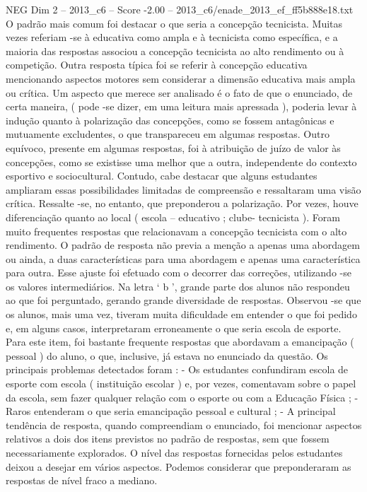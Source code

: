 \begin{textsample}{NEG Dim 2 – 2013\_c6 – Score -2.00 – 2013\_c6/enade\_2013\_ef\_ff5b888e18.txt}
O padrão mais comum foi destacar o que seria a concepção tecnicista.
Muitas vezes referiam -se à educativa como ampla e à tecnicista como específica, e a maioria das respostas associou a concepção tecnicista ao alto rendimento ou à competição.
Outra resposta típica foi se referir à concepção educativa mencionando aspectos motores sem considerar a dimensão educativa mais ampla ou crítica.
Um aspecto que merece ser analisado é o fato de que o enunciado, de certa maneira, ( pode -se dizer, em uma leitura mais apressada ), poderia levar à indução quanto à polarização das concepções, como se fossem antagônicas e mutuamente excludentes, o que transpareceu em algumas respostas.
Outro equívoco, presente em algumas respostas, foi à atribuição de juízo de valor às concepções, como se existisse uma melhor que a outra, independente do contexto esportivo e sociocultural.
Contudo, cabe destacar que alguns estudantes ampliaram essas possibilidades limitadas de compreensão e ressaltaram uma visão crítica.
Ressalte -se, no entanto, que preponderou a polarização.
Por vezes, houve diferenciação quanto ao local ( escola – educativo ; clube- tecnicista ).
Foram muito frequentes respostas que relacionavam a concepção tecnicista com o alto rendimento.
O padrão de resposta não previa a menção a apenas uma abordagem ou ainda, a duas características para uma abordagem e apenas uma característica para outra.
Esse ajuste foi efetuado com o decorrer das correções, utilizando -se os valores intermediários.
Na letra ‘ b ’, grande parte dos alunos não respondeu ao que foi perguntado, gerando grande diversidade de respostas.
Observou -se que os alunos, mais uma vez, tiveram muita dificuldade em entender o que foi pedido e, em alguns casos, interpretaram erroneamente o que seria escola de esporte.
Para este item, foi bastante frequente respostas que abordavam a emancipação ( pessoal ) do aluno, o que, inclusive, já estava no enunciado da questão.
Os principais problemas detectados foram : - Os estudantes confundiram escola de esporte com escola ( instituição escolar ) e, por vezes, comentavam sobre o papel da escola, sem fazer qualquer relação com o esporte ou com a Educação Física ; - Raros entenderam o que seria emancipação pessoal e cultural ; - A principal tendência de resposta, quando compreendiam o enunciado, foi mencionar aspectos relativos a dois dos itens previstos no padrão de respostas, sem que fossem necessariamente explorados.
O nível das respostas fornecidas pelos estudantes deixou a desejar em vários aspectos.
Podemos considerar que preponderaram as respostas de nível fraco a mediano.

\end{textsample}
